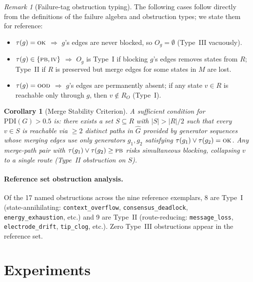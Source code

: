 \documentclass[11pt,letterpaper]{article}
\theoremstyle{plain}
\newtheorem{corollary}[theorem]{Corollary}
\theoremstyle{definition}
\theoremstyle{remark}
\newtheorem{remark}[theorem]{Remark}
\newcommand{\PDI}{\mathrm{PDI}}
\newcommand{\OK}{\textup{\textsc{ok}}}
\newcommand{\PB}{\textup{\textsc{pb}}}
\newcommand{\IV}{\textup{\textsc{iv}}}
\newcommand{\OD}{\textup{\textsc{ood}}}
\newcommand{\jn}{\vee}  %
\newcommand{\Ghat}{\hat{G}}
\begin{document}
\begin{remark}[Failure-tag obstruction typing]
  \label{thm:bridge}
  The following cases follow directly from the definitions of the
  failure algebra and obstruction types; we state them for reference:
  \begin{itemize}
    \item $\tau(g) = \OK$ $\Rightarrow$ $g$'s edges are never blocked,
      so $O_g = \emptyset$ (Type~III vacuously).
    \item $\tau(g) \in \{\PB, \IV\}$ $\Rightarrow$ $O_g$ is Type~I if
      blocking $g$'s edges removes states from $R$; Type~II if
      $R$ is preserved but merge edges for some states in $M$ are lost.
    \item $\tau(g) = \OD$ $\Rightarrow$ $g$'s edges are permanently absent;
      if any state $v \in R$ is reachable only through $g$, then
      $v \notin R_O$ (Type~I).
  \end{itemize}
\end{remark}

\begin{corollary}[Merge Stability Criterion]
  \label{cor:merge}
  A sufficient condition for $\PDI(G) > 0.5$ is:
  there exists a set $S \subseteq R$ with $|S| > |R|/2$ such that
  every $v \in S$ is reachable via $\geq 2$ distinct paths in $\Ghat$
  provided by generator sequences whose merging edges use only generators
  $g_1, g_2$ satisfying $\tau(g_1) \jn \tau(g_2) = \OK$.
  Any merge-path pair with $\tau(g_1) \jn \tau(g_2) \geq \PB$
  risks simultaneous blocking, collapsing $v$ to a single route
  (Type~II obstruction on $S$).
\end{corollary}

\paragraph{Reference set obstruction analysis.}
Of the 17 named obstructions across the nine reference exemplars,
8 are Type~I (state-annihilating: \texttt{context\_overflow},
\texttt{consensus\_deadlock}, \texttt{energy\_exhaustion}, etc.)
and 9 are Type~II (route-reducing: \texttt{message\_loss},
\texttt{electrode\_drift}, \texttt{tip\_clog}, etc.).
Zero Type~III obstructions appear in the reference set.

\section{Experiments}
\label{sec:experiments}
\end{document}
